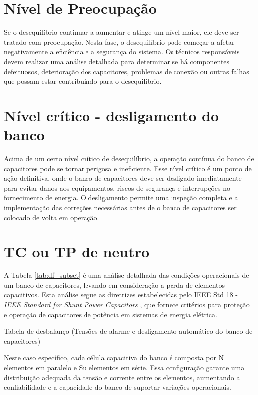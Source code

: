 \documentclass[a4paper]{article}
\begin{document}
\section{Nível de Preocupação}
Se o desequilíbrio continuar a aumentar e atinge um nível maior, ele deve ser tratado com preocupação. Nesta fase, o desequilíbrio pode começar a afetar negativamente a eficiência e a segurança do sistema. Os técnicos responsáveis devem realizar uma análise detalhada para determinar se há componentes defeituosos, deterioração dos capacitores, problemas de conexão ou outras falhas que possam estar contribuindo para o desequilíbrio.

\section{Nível crítico - desligamento do banco}
Acima de um certo nível crítico de desequilíbrio, a operação contínua do banco de capacitores pode se tornar perigosa e ineficiente. Esse nível crítico é um ponto de ação definitiva, onde o banco de capacitores deve ser desligado imediatamente para evitar danos aos equipamentos, riscos de segurança e interrupções no fornecimento de energia. O desligamento permite uma inspeção completa e a implementação das correções necessárias antes de o banco de capacitores ser colocado de volta em operação.

\section{TC ou TP de neutro}
A Tabela \ref{tab:df_subset} é uma análise detalhada das condições operacionais de um banco de capacitores, levando em consideração a perda de elementos capacitivos. Esta análise segue as diretrizes estabelecidas pelo \href{https://ieeexplore.ieee.org/document/6466331}{IEEE Std 18 - \textit{IEEE Standard for Shunt Power Capacitors} \cite{ieee18}}, que fornece critérios para proteção e operação de capacitores de potência em sistemas de energia elétrica.

\begin{table}[htbp]
	\centering
	\caption[]{Tabela de desbalanço (Tensões de alarme e desligamento automático do banco de capacitores)}
	
	\label{tab:df_subset}
\end{table}




Neste caso específico, cada célula capacitiva do banco é composta por {{N}} elementos em paralelo e {{Su}} elementos em série. Essa configuração garante uma distribuição adequada da tensão e corrente entre os elementos, aumentando a confiabilidade e a capacidade do banco de suportar variações operacionais.
\end{document}
